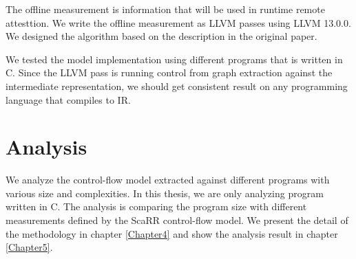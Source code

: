 The offline measurement is information that will be used in runtime remote
attesttion. We write the offline measurement as LLVM passes using LLVM 13.0.0.
We designed the algorithm based on the description in the original paper. 


We tested the model implementation using different programs that is written in
C. Since the LLVM pass is running control from graph extraction against the
intermediate representation, we should get consistent result on any programming
language that compiles to IR. 


\section{Analysis}
\label{sec:analysis}

We analyze the control-flow model extracted against different programs with
various size and complexities. In this thesis, we are only analyzing program
written in C. The analysis is comparing the program size with different
measurements defined by the ScaRR control-flow model. We present the detail of
the methodology in chapter \ref{Chapter4} and show the analysis result in
chapter \ref{Chapter5}.